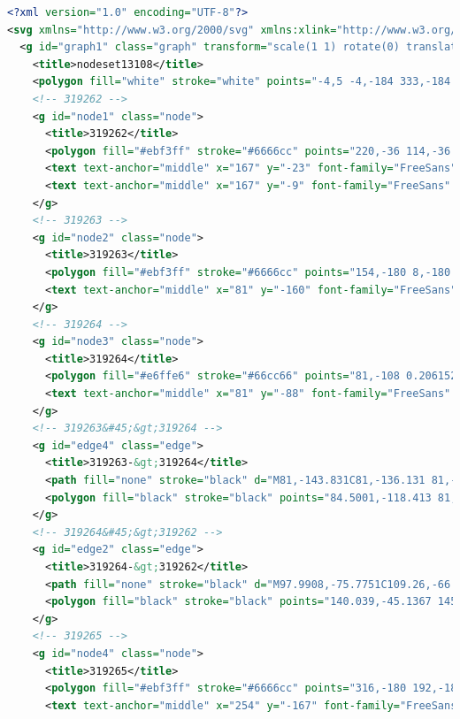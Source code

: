\lstset{language=XML}
\begin{lstlisting}[caption={Primjer AIF SVG dokumenta},label={lst:aif_svg},language=XML, captionpos=b, basicstyle=\scriptsize]
<?xml version="1.0" encoding="UTF-8"?>
<svg xmlns="http://www.w3.org/2000/svg" xmlns:xlink="http://www.w3.org/1999/xlink" width="336pt" height="188pt" viewBox="0.00 0.00 336.00 188.00">
  <g id="graph1" class="graph" transform="scale(1 1) rotate(0) translate(4 184)">
    <title>nodeset13108</title>
    <polygon fill="white" stroke="white" points="-4,5 -4,-184 333,-184 333,5 -4,5" />
    <!-- 319262 -->
    <g id="node1" class="node">
      <title>319262</title>
      <polygon fill="#ebf3ff" stroke="#6666cc" points="220,-36 114,-36 114,-1.77636e-14 220,-3.55271e-15 220,-36" />
      <text text-anchor="middle" x="167" y="-23" font-family="FreeSans" font-size="10.00">Student Ivo bi trebao</text>
      <text text-anchor="middle" x="167" y="-9" font-family="FreeSans" font-size="10.00">položiti PZUIS</text>
    </g>
    <!-- 319263 -->
    <g id="node2" class="node">
      <title>319263</title>
      <polygon fill="#ebf3ff" stroke="#6666cc" points="154,-180 8,-180 8,-144 154,-144 154,-180" />
      <text text-anchor="middle" x="81" y="-160" font-family="FreeSans" font-size="10.00">Student Ivo je predao seminar</text>
    </g>
    <!-- 319264 -->
    <g id="node3" class="node">
      <title>319264</title>
      <polygon fill="#e6ffe6" stroke="#66cc66" points="81,-108 0.206152,-90 81,-72 161.794,-90 81,-108" />
      <text text-anchor="middle" x="81" y="-88" font-family="FreeSans" font-size="10.00">Default Inference</text>
    </g>
    <!-- 319263&#45;&gt;319264 -->
    <g id="edge4" class="edge">
      <title>319263-&gt;319264</title>
      <path fill="none" stroke="black" d="M81,-143.831C81,-136.131 81,-126.974 81,-118.417" />
      <polygon fill="black" stroke="black" points="84.5001,-118.413 81,-108.413 77.5001,-118.413 84.5001,-118.413" />
    </g>
    <!-- 319264&#45;&gt;319262 -->
    <g id="edge2" class="edge">
      <title>319264-&gt;319262</title>
      <path fill="none" stroke="black" d="M97.9908,-75.7751C109.26,-66.3402 124.348,-53.709 137.541,-42.6634" />
      <polygon fill="black" stroke="black" points="140.039,-45.1367 145.46,-36.0336 135.545,-39.7694 140.039,-45.1367" />
    </g>
    <!-- 319265 -->
    <g id="node4" class="node">
      <title>319265</title>
      <polygon fill="#ebf3ff" stroke="#6666cc" points="316,-180 192,-180 192,-144 316,-144 316,-180" />
      <text text-anchor="middle" x="254" y="-167" font-family="FreeSans" font-size="10.00">Student Ivo nije pristupio</text>

\end{lstlisting}
